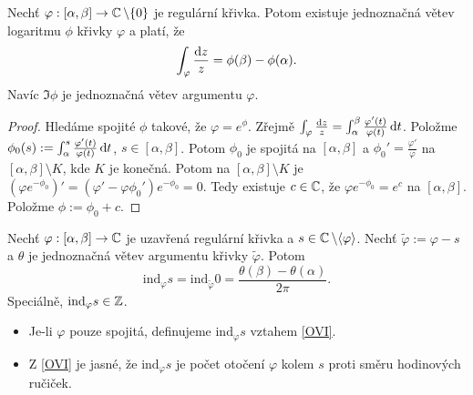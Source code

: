 \begin{theorem}
Nechť $\varphi: [\alpha, \beta] \rightarrow \operatorname{\mathbb{C}}  \setminus \{0\}$ je regulární křivka. Potom existuje jednoznačná větev logaritmu $\phi$ křivky $\varphi$ a platí, že
$$
\int_\varphi \frac{\mathop{}\!\mathrm{d} z}{z}=\phi(\beta) - \phi(\alpha) \text{.}
$$
Navíc $\Im \phi$ je jednoznačná větev argumentu $\varphi$.
\end{theorem}
\begin{proof}
Hledáme spojité $\phi$ takové, že $\varphi=e^\phi$. Zřejmě $\int_\varphi \frac{\mathop{}\!\mathrm{d} z}{z}=\int_\alpha^\beta \frac{\varphi'(t)}{\varphi(t)} \mathop{}\!\mathrm{d} t$. Položme $\phi_0(s):=\int_\alpha^s \frac{\varphi'(t)}{\varphi(t)} \mathop{}\!\mathrm{d} t$, $s \in [\alpha, \beta]$. Potom $\phi_0$ je spojitá na $[\alpha, \beta]$ a $\phi_0'=\frac{\varphi'}{\varphi}$ na $[\alpha, \beta] \setminus K$, kde $K$ je konečná. Potom na $[\alpha, \beta] \setminus K$ je $(\varphi e^{-\phi_0})'=(\varphi' - \varphi \phi_0') e^{-\phi_0}=0$. Tedy existuje $c \in \operatorname{\mathbb{C}} $, že $\varphi e^{-\phi_0}=e^c$ na $[\alpha, \beta]$. Položme $\phi:=\phi_0+c$.
\end{proof}

\begin{theorem}
Nechť $\varphi: [\alpha, \beta] \rightarrow \operatorname{\mathbb{C}} $ je uzavřená regulární křivka a $s \in \operatorname{\mathbb{C}} \setminus \langle \varphi \rangle$. Nechť $\widetilde{\varphi}:=\varphi-s$ a $\theta$ je jednoznačná větev argumentu křivky $\widetilde{\varphi}$. Potom
\begin{equation}\tag{oVI}\label{OVI}
    \text{ind}_\varphi s= \text{ind}_{\widetilde{\varphi}}0=\frac{\theta(\beta)-\theta(\alpha)}{2 \pi}\text{.}
\end{equation}
Speciálně, $\text{ind}_\varphi s \in \operatorname{\mathbb{Z}}$.
\end{theorem}

\begin{note*}
\begin{itemize}
    \item Je-li $\varphi$ pouze spojitá, definujeme $\text{ind}_\varphi s$ vztahem \cref{OVI}.
    \item Z \cref{OVI} je jasné, že $\text{ind}_\varphi s$ je počet otočení $\varphi$ kolem $s$ proti směru hodinových ručiček.
\end{itemize}
\end{note*}

